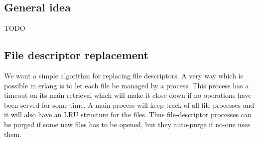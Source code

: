 \documentclass[a4paper]{report}
\begin{document}
\subsection{General idea}
TODO

\subsection{File descriptor replacement}
We want a simple algorithm for replacing file descriptors. A very way
which is possible in erlang is to let each file be managed by a
process. This process has a timeout on its main retrieval which will
make it close down if no operations have been served for some time. A
main process will keep track of all file processes and it will also
have an LRU structure for the files. Thus file-descriptor processes can be
purged if some new files has to be opened, but they auto-purge if
no-one uses them.
\end{document}
